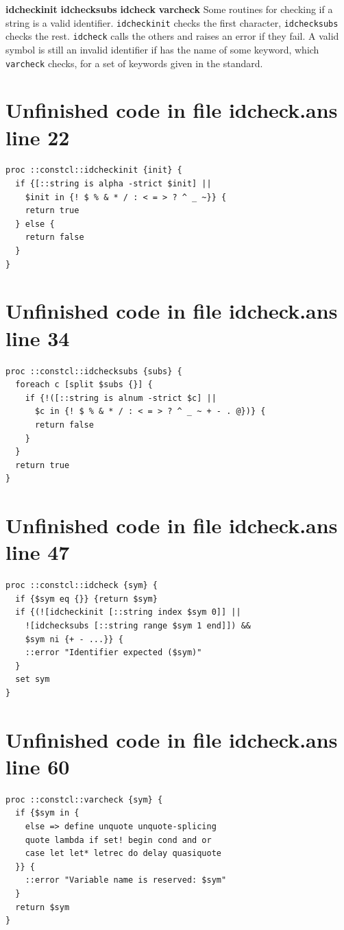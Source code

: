 \documentclass[twoside,9pt]{report}
\begin{document}
\textbf{idcheckinit} \textbf{idchecksubs} \textbf{idcheck} \textbf{varcheck} Some routines for checking if a string is a valid identifier. \texttt{idcheckinit} checks the first character, \texttt{idchecksubs} checks the rest. \texttt{idcheck} calls the others and raises an error if they fail. A valid symbol is still an invalid identifier if has the name of some keyword, which \texttt{varcheck} checks, for a set of keywords given in the standard.

\section{Unfinished code in file idcheck.ans line 22}
\begin{lstlisting}
proc ::constcl::idcheckinit {init} {
  if {[::string is alpha -strict $init] ||
    $init in {! $ % & * / : < = > ? ^ _ ~}} {
    return true
  } else {
    return false
  }
}
\end{lstlisting}
\section{Unfinished code in file idcheck.ans line 34}
\begin{lstlisting}
proc ::constcl::idchecksubs {subs} {
  foreach c [split $subs {}] {
    if {!([::string is alnum -strict $c] ||
      $c in {! $ % & * / : < = > ? ^ _ ~ + - . @})} {
      return false
    }
  }
  return true
}
\end{lstlisting}
\section{Unfinished code in file idcheck.ans line 47}
\begin{lstlisting}
proc ::constcl::idcheck {sym} {
  if {$sym eq {}} {return $sym}
  if {(![idcheckinit [::string index $sym 0]] ||
    ![idchecksubs [::string range $sym 1 end]]) &&
    $sym ni {+ - ...}} {
    ::error "Identifier expected ($sym)"
  }
  set sym
}
\end{lstlisting}
\section{Unfinished code in file idcheck.ans line 60}
\begin{lstlisting}
proc ::constcl::varcheck {sym} {
  if {$sym in {
    else => define unquote unquote-splicing
    quote lambda if set! begin cond and or
    case let let* letrec do delay quasiquote
  }} {
    ::error "Variable name is reserved: $sym"
  }
  return $sym
}
\end{lstlisting}
\end{document}

